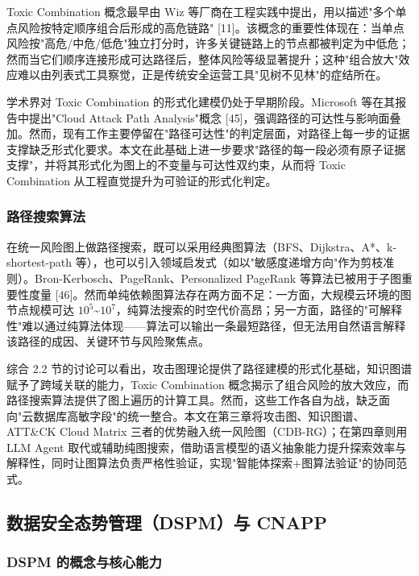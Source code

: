 \documentclass[a4paper,12pt]{ctexart}
\begin{document}
Toxic Combination 概念最早由 Wiz 等厂商在工程实践中提出，用以描述"多个单点风险按特定顺序组合后形成的高危链路" [11]。该概念的重要性体现在：当单点风险按"高危/中危/低危"独立打分时，许多关键链路上的节点都被判定为中低危；然而当它们顺序连接形成可达路径后，整体风险等级显著提升；这种"组合放大"效应难以由列表式工具察觉，正是传统安全运营工具"见树不见林"的症结所在。

学术界对 Toxic Combination 的形式化建模仍处于早期阶段。Microsoft 等在其报告中提出"Cloud Attack Path Analysis"概念 [45]，强调路径的可达性与影响面叠加。然而，现有工作主要停留在"路径可达性"的判定层面，对路径上每一步的证据支撑缺乏形式化要求。本文在此基础上进一步要求"路径的每一段必须有原子证据支撑"，并将其形式化为图上的不变量与可达性双约束，从而将 Toxic Combination 从工程直觉提升为可验证的形式化判定。

\subsubsection{路径搜索算法}

在统一风险图上做路径搜索，既可以采用经典图算法（BFS、Dijkstra、A*、k-shortest-path 等），也可以引入领域启发式（如以"敏感度递增方向"作为剪枝准则）。Bron-Kerbosch、PageRank、Personalized PageRank 等算法已被用于子图重要性度量 [46]。然而单纯依赖图算法存在两方面不足：一方面，大规模云环境的图节点规模可达 $10^5$\textasciitilde{}$10^7$，纯算法搜索的时空代价高昂；另一方面，路径的"可解释性"难以通过纯算法体现——算法可以输出一条最短路径，但无法用自然语言解释该路径的成因、关键环节与风险聚焦点。

综合 2.2 节的讨论可以看出，攻击图理论提供了路径建模的形式化基础，知识图谱赋予了跨域关联的能力，Toxic Combination 概念揭示了组合风险的放大效应，而路径搜索算法提供了图上遍历的计算工具。然而，这些工作各自为战，缺乏面向"云数据库高敏字段"的统一整合。本文在第三章将攻击图、知识图谱、ATT\&CK Cloud Matrix 三者的优势融入统一风险图（CDB-RG）；在第四章则用 LLM Agent 取代或辅助纯图搜索，借助语言模型的语义抽象能力提升探索效率与解释性，同时让图算法负责严格性验证，实现"智能体探索+图算法验证"的协同范式。

\subsection{数据安全态势管理（DSPM）与 CNAPP}

\subsubsection{DSPM 的概念与核心能力}
\end{document}
